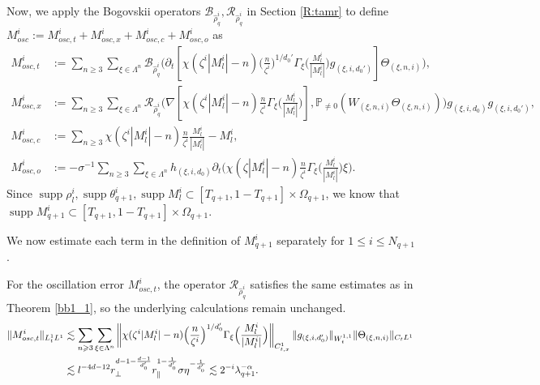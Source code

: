 \documentclass[10pt,a4paper]{amsart}
\numberwithin{equation}{section}
\DeclareMathOperator{\supp}{supp}
\def\({{\Big(}}
\def\){{\Big)}}
\newcommand{\norm}[1]{\left\|#1\right\|}
\def\geq{\geqslant}
\def\leq{\leqslant}
\def\({{\Big(}}
\def\){{\Big)}}
\def\geq{\geqslant}
\def\leq{\leqslant}
\begin{document}
Now, we  apply the  Bogovskii  operators $\mathcal{B}_{\hat{\rho}_q^i},\mathcal{R}_{\hat{\rho}_q^i}$ in Section \ref{R:tamr} to   define $M^{i}_{osc}:=M^{i}_{osc,t}+M^{i}_{osc,x}+M^{i}_{osc,c}+M^{i}_{osc,o}$ as
\begin{align*}
   M^{i}_{osc,t}&:=\sum_{n\geq3}\sum_{\xi\in\Lambda^{n}}\mathcal{B}_{\hat{\rho}_q^i}\(\partial_t[\chi(\zeta^{i}|M^{i}_l|-n)\(\frac{n}{\zeta^{i}}\)^{1/d_0'}\Gamma_{\xi}\(\frac{M^{i}_l}{|M^{i}_l|}\)g_{(\xi,i,d_0')}]\Theta_{(\xi,n,i)}\),\\
M^{i}_{osc,x}&:=\sum_{n\geq3}\sum_{\xi\in\Lambda^{n}}\mathcal{R}_{\hat{\rho}_q^i}\(\nabla[\chi(\zeta^{i}|M^{i}_l|-n)\frac{n}{\zeta^{i}}\Gamma_{\xi}\(\frac{M^{i}_l}{|M^{i}_l|}\)],\mathbb{P}_{\neq0}(W_{(\xi,n,i)}\Theta_{(\xi,n,i)})\)g_{(\xi,i,d_0)}g_{(\xi,i,d_0')},\\
   M^{i}_{osc,c}&:=\sum_{n\geq3}\chi(\zeta^{i}|M^{i}_l|-n)\frac{n}{\zeta^{i}}\frac{M^{i}_l}{|M^{i}_l|}- M^{i}_l,\\
    M^{i}_{osc,o}&:=-\sigma^{-1}\sum_{n\geq3}\sum_{\xi\in\Lambda^{n}}h_{(\xi,i,d_0)}\partial_t\(\chi(\zeta|M_l^i|-n)\frac{n}{\zeta^i}\Gamma_{\xi}\(\frac{M_l^i}{|M_l^i|}\)\xi\).%
\end{align*}
Since $\supp \rho^i_l,\supp \theta_{q+1}^i,\supp M_l^i\subset[T_{q+1},1-T_{q+1}]\times\Omega_{q+1}$, we know that $\supp M_{q+1}^i\subset[T_{q+1},1-T_{q+1}]\times\Omega_{q+1}$.

 We now estimate each term in the definition of $M_{q+1}^i$ separately  for $1\leq i\leq N_{q+1}$.

For the oscillation error $M^{i}_{osc,t}$,  the operator $\mathcal{R}_{\hat{\rho}_q^i}$ satisfies the same estimates as in Theorem \ref{bb1_1}, so the underlying calculations remain unchanged.  
\begin{align}
    \|M^{i}_{osc,t}\|_{L^1_tL^1}%
    &\lesssim \sum_{n\geq3}\sum_{\xi\in\Lambda^{n}}\norm{\chi(\zeta^{i}|M^{i}_l|-n)\(\frac{n}{\zeta^{i}}\)^{1/d_0'}\Gamma_{\xi}\(\frac{M^{i}_l}{|M^{i}_l|}\)}_{C_{t,x}^1}\|g_{(\xi,i,d_0')}\|_{W_t^{1,1}} \|\Theta_{(\xi,n,i)}\|_{C_tL^1}\notag\\
    &\lesssim l^{-4d-12}r_\perp^{d-1-\frac{d-1}{d_0'}}r_\parallel^{1-\frac{1}{d_0'}}\sigma \eta^{-\frac{1}{d_0'}} \lesssim2^{-i} \lambda_{q+1}^{-\alpha}.\notag
\end{align} 
\end{document}
